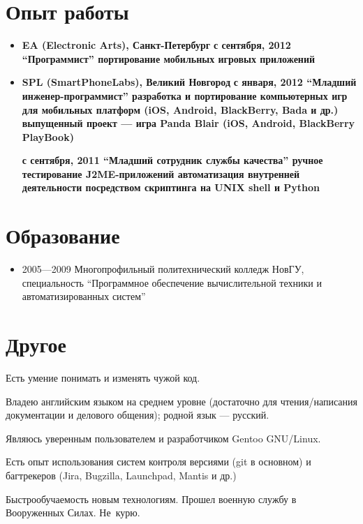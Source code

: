 \section{Опыт работы}
\begin{itemize}
\item {
\fontsize{14pt}{14pt}\selectfont
\bfseries EA (Electronic Arts)\mdseries, Санкт-Петербург
}
\subitem \bfseries с сентября, 2012 ``Программист''\mdseries
\subsubitem портирование мобильных игровых приложений

\item {
\fontsize{14pt}{14pt}\selectfont
\bfseries SPL (SmartPhoneLabs)\mdseries, Великий Новгород
}
\subitem \bfseries с января, 2012 ``Младший инженер-программист''\mdseries
\subsubitem разработка и портирование компьютерных игр для мобильных платформ
(iOS, Android, BlackBerry, Bada и др.)
\subsubitem выпущенный проект --- игра Panda Blair (iOS, Android, BlackBerry PlayBook)

\subitem \bfseries с сентября, 2011 ``Младший сотрудник службы качества''\mdseries
\subsubitem ручное тестирование J2ME-приложений
\subsubitem автоматизация внутренней деятельности посредством скриптинга на UNIX shell
и Python
\end{itemize}

\section{Образование}
\begin{itemize}
\item 2005---2009 Многопрофильный политехнический колледж НовГУ, специальность
``Программное обеспечение вычислительной техники и автоматизированных систем''
\end{itemize}

\section{Другое}
Есть умение понимать и изменять чужой код.

Владею английским языком на среднем уровне (достаточно для чтения/написания
документации и делового общения); родной язык --- русский.

Являюсь уверенным пользователем и разработчиком Gentoo GNU/Linux.

Есть опыт использования систем контроля версиями (git в основном) и
багтрекеров (Jira, Bugzilla, Launchpad, Mantis и др.)

Быстрообучаемость новым технологиям.
Прошел военную службу в Вооруженных Силах.
Не~курю.
